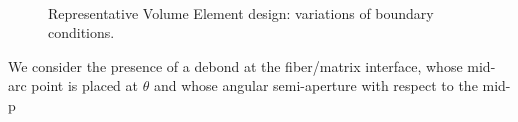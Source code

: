 \documentclass[a4paper]{jpconf}
\begin{document}
\begin{figure}[H]
\quad{}\\
\caption{Representative Volume Element design: variations of boundary conditions.}
\label{fig:allRVEs}
\end{figure}
We consider the presence of a debond at the fiber/matrix interface, whose mid-arc point is placed at $\theta$ and whose angular semi-aperture with respect to the mid-p
\end{document}
